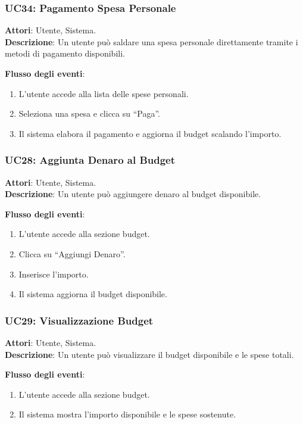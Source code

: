 \subsubsection{UC34: Pagamento Spesa Personale}
\textbf{Attori}: Utente, Sistema. \\
\textbf{Descrizione}: Un utente può saldare una spesa personale direttamente tramite i metodi di pagamento disponibili.

\textbf{Flusso degli eventi}:
\begin{enumerate}
    \item L’utente accede alla lista delle spese personali.
    \item Seleziona una spesa e clicca su ``Paga''.
    \item Il sistema elabora il pagamento e aggiorna il budget scalando l’importo.
\end{enumerate}

\subsubsection{UC28: Aggiunta Denaro al Budget}
\textbf{Attori}: Utente, Sistema. \\
\textbf{Descrizione}: Un utente può aggiungere denaro al budget disponibile.

\textbf{Flusso degli eventi}:
\begin{enumerate}
    \item L’utente accede alla sezione budget.
    \item Clicca su ``Aggiungi Denaro''.
    \item Inserisce l’importo.
    \item Il sistema aggiorna il budget disponibile.
\end{enumerate}

\subsubsection{UC29: Visualizzazione Budget}
\textbf{Attori}: Utente, Sistema. \\
\textbf{Descrizione}: Un utente può visualizzare il budget disponibile e le spese totali.

\textbf{Flusso degli eventi}:
\begin{enumerate}
    \item L’utente accede alla sezione budget.
    \item Il sistema mostra l’importo disponibile e le spese sostenute.
\end{enumerate}

